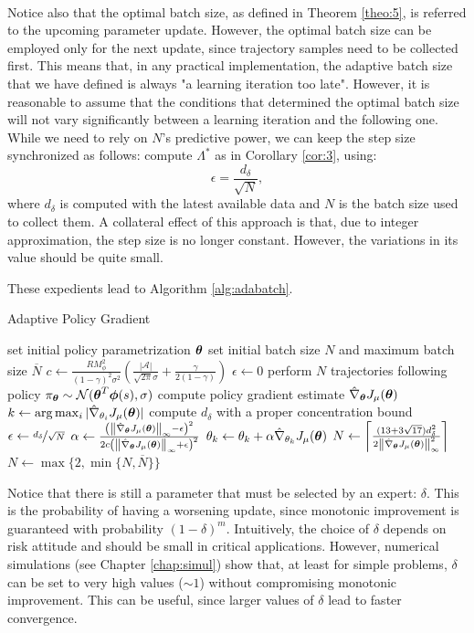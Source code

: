 \paragraph{}
Notice also that the optimal batch size, as defined in Theorem \ref{theo:5}, is referred to the upcoming parameter update. However, the optimal batch size can be employed only for the next update, since trajectory samples need to be collected first. This means that, in any practical implementation, the adaptive batch size that we have defined is always "a learning iteration too late". However, it is reasonable to assume that the conditions that determined the optimal batch size will not vary significantly between a learning iteration and the following one. While we need to rely on $N$'s predictive power, we can keep the step size synchronized as follows: compute $\Lambda^*$ as in Corollary \ref{cor:3}, using:
\[
	\epsilon = \frac{d_\delta}{\sqrt{N}},
\]
where $d_\delta$ is computed with the latest available data and $N$ is the batch size used to collect them. A collateral effect of this approach is that, due to integer approximation, the step size is no longer constant. However, the variations in its value should be quite small.

These expedients lead to Algorithm \ref{alg:adabatch}. 
\begin{algorithm}[t]
\caption{Adaptive Policy Gradient}
\label{alg:adabatch}
\begin{algorithmic}
\State set initial policy parametrization $\vtheta$
\State set initial batch size $N$ and maximum batch size $\overline{N}$
\State $c \gets 		\frac{RM_{\phi}^2}{(1-\gamma)^2\sigma^2}\left(\frac{|\mathcal{A}|}{\sqrt{2\pi}\sigma} +	\frac{\gamma}{2(1-\gamma)}\right)$
\State $\epsilon \gets 0$
\While{$\epsilon < |\gradApp{\vtheta}|$} 
\State perform $N$ trajectories following policy 
	$\pi_{\vtheta} \sim \mathcal{N}(\vtheta^T\vphi(s),\sigma)$
\State compute policy gradient estimate $\gradApp{\vtheta}$
\State $k \gets \arg\max_i|\gradApp{\theta_i}|$
\State compute $d_\delta$ with a proper concentration bound
\State $\epsilon \gets \nicefrac{d_\delta}{\sqrt{N}}$
\State $\alpha \gets \frac{
		\left(\norm[\infty]{\gradApp{\vtheta}} - \epsilon\right)^2}
		{2c
		\left(\norm[\infty]{\gradApp{\vtheta}} + \epsilon\right)^2}$
\State $\theta_k \gets \theta_k + \alpha\gradApp{\theta_k}$
\State $N \gets \left\lceil\frac{(13+3\sqrt{17})d_{\delta}^2}{2\norm[\infty]{\gradApp{\vtheta}}^2}\right\rceil$
\State $N \gets \max\{2,\min\{N,\overline{N}\}\}$
\EndWhile
\end{algorithmic}
\end{algorithm}
Notice that there is still a parameter that must be selected by an expert: $\delta$. This is the probability of having a worsening update, since monotonic improvement is guaranteed with probability $(1-\delta)^m$. Intuitively, the choice of $\delta$ depends on risk attitude and should be small in critical applications. However, numerical simulations (see Chapter \ref{chap:simul}) show that, at least for simple problems, $\delta$ can be set to very high values ($\sim 1$) without compromising monotonic improvement. This can be useful, since larger values of $\delta$ lead to faster convergence.

